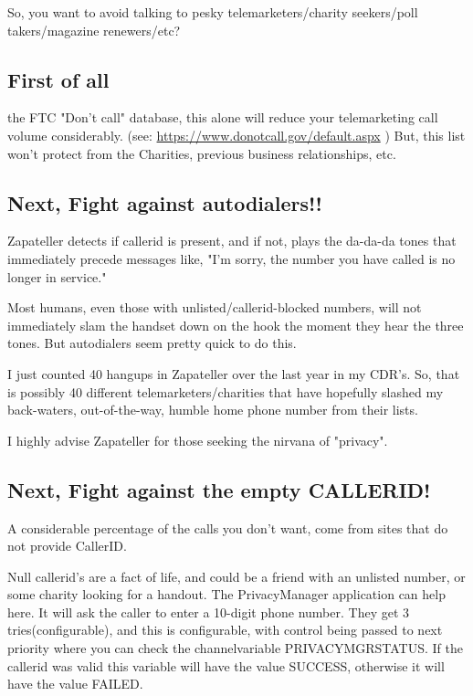 So, you want to avoid talking to pesky telemarketers/charity
seekers/poll takers/magazine renewers/etc?

\subsection{First of all}

 the FTC "Don't call" database, this alone will reduce your
telemarketing call volume considerably.  (see:
\url{https://www.donotcall.gov/default.aspx} ) But, this list won't protect
from the Charities, previous business relationships, etc.

\subsection{Next, Fight against autodialers!!}

Zapateller detects if callerid is present, and if not, plays the
da-da-da tones that immediately precede messages like, "I'm sorry,
the number you have called is no longer in service."

Most humans, even those with unlisted/callerid-blocked numbers, will
not immediately slam the handset down on the hook the moment they hear
the three tones. But autodialers seem pretty quick to do this.

I just counted 40 hangups in Zapateller over the last year in my
CDR's.  So, that is possibly 40 different telemarketers/charities that have
hopefully slashed my back-waters, out-of-the-way, humble home phone
number from their lists.

I highly advise Zapateller for those seeking the nirvana of "privacy".


\subsection{Next, Fight against the empty CALLERID!}

A considerable percentage of the calls you don't want, come from
sites that do not provide CallerID.

Null callerid's are a fact of life, and could be a friend with an
unlisted number, or some charity looking for a handout. The
PrivacyManager application can help here. It will ask the caller to
enter a 10-digit phone number. They get 3 tries(configurable), and this is
configurable, with control being passed to next priority where you can
check the channelvariable PRIVACYMGRSTATUS. If the callerid was valid this
variable will have the value SUCCESS, otherwise it will have the value
FAILED.

